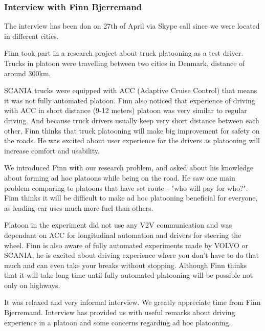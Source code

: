 \subsubsection{Interview with Finn Bjerremand}


The interview has been don on 27th of April via Skype call since we were located in different cities.\par
% 
Finn took part in a research project about truck platooning as a test driver. Trucks in platoon were travelling between two cities in Denmark, distance of around 300km.\par
% 
SCANIA trucks were equipped with ACC (Adaptive Cruise Control) that means it was not fully automated platoon. Finn also noticed that experience of driving with ACC in short distance (9-12 meters) platoon was very similar to regular driving. And because truck drivers usually keep very short distance between each other, Finn thinks that truck platooning will make big improvement for safety on the roads. He was excited about user experience for the drivers as platooning will increase comfort and usability.\par
% 
We introduced Finn with our research problem, and asked about his knowledge about forming ad hoc platoons while being on the road. He saw one main problem comparing to platoons that have set route - "who will pay for who?". Finn thinks it will be difficult to make ad hoc platooning beneficial for everyone, as leading car uses much more fuel than others.\par
% 
Platoon in the experiment did not use any V2V communication and was dependant on ACC for longitudinal automation and drivers for steering the wheel. Finn is also aware of fully automated experiments made by VOLVO or SCANIA, he is excited about driving experience where you don't have to do that much and can even take your breaks without stopping. Although Finn thinks that it will take long time until fully automated platooning will be possible not only on highways.\par
% 
It was relaxed and very informal interview. We greatly appreciate time from Finn Bjerremand. Interview has provided us with useful remarks about driving experience in a platoon and some concerns regarding ad hoc platooning.